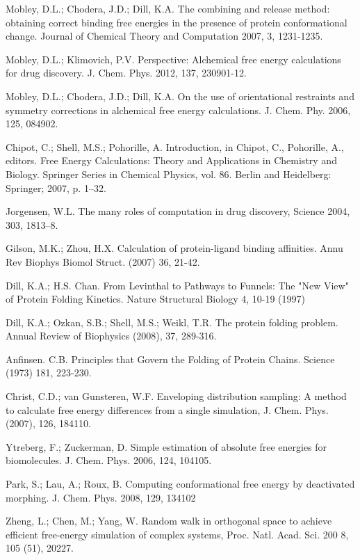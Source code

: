 \documentclass[12pt]{article}
\begin{document}
\begin{thebibliography}{99}
Mobley, D.L.; Chodera, J.D.; Dill, K.A. The combining and release method: obtaining correct binding free energies in
the presence of protein conformational change. Journal of Chemical Theory and Computation 2007, 3, 1231-1235.

Mobley, D.L.; Klimovich, P.V. Perspective: Alchemical free energy calculations for drug discovery.
J. Chem. Phys. 2012, 137, 230901-12.

Mobley, D.L.; Chodera, J.D.; Dill, K.A. On the use of orientational restraints and symmetry corrections in alchemical
free energy calculations. J. Chem. Phy. 2006, 125, 084902.

Chipot, C.; Shell, M.S.; Pohorille, A. Introduction, in Chipot, C., Pohorille, A., editors. Free Energy
Calculations: Theory and Applications in Chemistry and Biology. Springer Series in Chemical
Physics, vol. 86. Berlin and Heidelberg: Springer; 2007, p. 1–32.

Jorgensen, W.L. The many roles of computation in drug discovery, Science 2004, 303, 1813–8.

Gilson, M.K.; Zhou, H.X. Calculation of protein-ligand binding affinities. Annu Rev Biophys Biomol Struct. (2007) 36, 21-42.

Dill, K.A.; H.S. Chan.  From Levinthal to Pathways to Funnels:  The "New View" of Protein Folding Kinetics.  Nature Structural Biology 4, 10-19 (1997)

Dill, K.A.; Ozkan, S.B.; Shell, M.S.; Weikl, T.R. The protein folding problem. Annual Review of Biophysics (2008), 37, 289-316.

Anfinsen. C.B. Principles that Govern the Folding of Protein Chains. Science (1973) 181, 223-230.

Christ, C.D.; van Gunsteren, W.F. Enveloping distribution sampling: A method to calculate free energy differences from a single simulation,
J. Chem. Phys. (2007), 126, 184110.

Ytreberg, F.; Zuckerman, D. Simple estimation of absolute free energies for biomolecules. J. Chem. Phys. 2006, 124, 104105.

Park, S.; Lau, A.; Roux, B. Computing conformational free energy by deactivated morphing. J. Chem. Phys. 2008, 129, 134102

Zheng, L.; Chen, M.; Yang, W. Random walk in orthogonal space to achieve efficient free-energy simulation of complex systems, Proc. Natl. Acad. Sci. 200
8, 105 (51), 20227.


\end{thebibliography}
\end{document}
